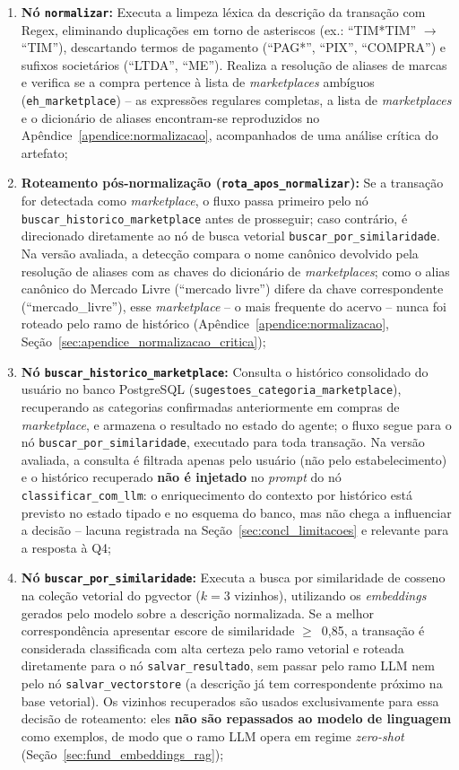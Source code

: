 \begin{enumerate}
	\item \textbf{Nó \texttt{normalizar}:} Executa a limpeza léxica da descrição da transação com Regex, eliminando duplicações em torno de asteriscos (ex.: ``TIM*TIM'' $\to$ ``TIM''), descartando termos de pagamento (``PAG*'', ``PIX'', ``COMPRA'') e sufixos societários (``LTDA'', ``ME''). Realiza a resolução de aliases de marcas e verifica se a compra pertence à lista de \textit{marketplaces} ambíguos (\texttt{eh\_marketplace}) -- as expressões regulares completas, a lista de \textit{marketplaces} e o dicionário de aliases encontram-se reproduzidos no Apêndice~\ref{apendice:normalizacao}, acompanhados de uma análise crítica do artefato;
	\item \textbf{Roteamento pós-normalização (\texttt{rota\_apos\_normalizar}):} Se a transação for detectada como \textit{marketplace}, o fluxo passa primeiro pelo nó \texttt{buscar\_historico\_marketplace} antes de prosseguir; caso contrário, é direcionado diretamente ao nó de busca vetorial \texttt{buscar\_por\_similaridade}. Na versão avaliada, a detecção compara o nome canônico devolvido pela resolução de aliases com as chaves do dicionário de \textit{marketplaces}; como o alias canônico do Mercado Livre (``mercado livre'') difere da chave correspondente (``mercado\_livre''), esse \textit{marketplace} -- o mais frequente do acervo -- nunca foi roteado pelo ramo de histórico (Apêndice~\ref{apendice:normalizacao}, Seção~\ref{sec:apendice_normalizacao_critica});
	\item \textbf{Nó \texttt{buscar\_historico\_marketplace}:} Consulta o histórico consolidado do usuário no banco PostgreSQL (\texttt{sugestoes\_categoria\_marketplace}), recuperando as categorias confirmadas anteriormente em compras de \textit{marketplace}, e armazena o resultado no estado do agente; o fluxo segue para o nó \texttt{buscar\_por\_similaridade}, executado para toda transação. Na versão avaliada, a consulta é filtrada apenas pelo usuário (não pelo estabelecimento) e o histórico recuperado \textbf{não é injetado} no \textit{prompt} do nó \texttt{classificar\_com\_llm}: o enriquecimento do contexto por histórico está previsto no estado tipado e no esquema do banco, mas não chega a influenciar a decisão -- lacuna registrada na Seção~\ref{sec:concl_limitacoes} e relevante para a resposta à Q4;
	\item \textbf{Nó \texttt{buscar\_por\_similaridade}:} Executa a busca por similaridade de cosseno na coleção vetorial do pgvector ($k = 3$ vizinhos), utilizando os \textit{embeddings} gerados pelo modelo \modelemb{} sobre a descrição normalizada. Se a melhor correspondência apresentar escore de similaridade $\ge$~0,85, a transação é considerada classificada com alta certeza pelo ramo vetorial e roteada diretamente para o nó \texttt{salvar\_resultado}, sem passar pelo ramo LLM nem pelo nó \texttt{salvar\_vectorstore} (a descrição já tem correspondente próximo na base vetorial). Os vizinhos recuperados são usados exclusivamente para essa decisão de roteamento: eles \textbf{não são repassados ao modelo de linguagem} como exemplos, de modo que o ramo LLM opera em regime \textit{zero-shot} (Seção~\ref{sec:fund_embeddings_rag});

\end{enumerate}
